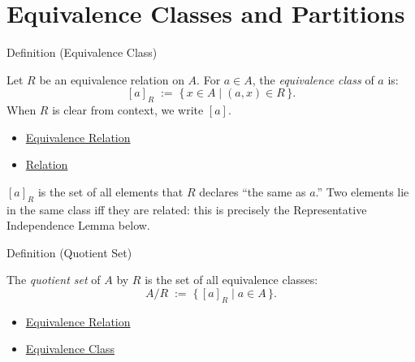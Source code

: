 
\section{Equivalence Classes and Partitions}


\begin{definitionbox}{Definition (Equivalence Class)}
\begin{definition}\label{def:equiv-class}
Let $R$ be an equivalence relation on $A$. For $a \in A$, the
\emph{equivalence class} of $a$ is:
\[
[a]_R \;:=\; \{\, x \in A \mid (a,x) \in R \,\}.
\]
When $R$ is clear from context, we write $[a]$.
\end{definition}
\end{definitionbox}

\begin{dependencies}
\begin{itemize}
  \item \hyperref[def:equivalence-relation]{Equivalence Relation}
  \item \hyperref[def:relation]{Relation}
\end{itemize}
\end{dependencies}

\begin{remark*}
$[a]_R$ is the set of all elements that $R$ declares ``the same as $a$.''
Two elements lie in the same class iff they are related: this is precisely
the Representative Independence Lemma below.
\end{remark*}

\begin{definitionbox}{Definition (Quotient Set)}
\begin{definition}\label{def:quotient-set}
The \emph{quotient set} of $A$ by $R$ is the set of all equivalence classes:
\[
A / R \;:=\; \{\, [a]_R \mid a \in A \,\}.
\]
\end{definition}
\end{definitionbox}

\begin{dependencies}
\begin{itemize}
  \item \hyperref[def:equivalence-relation]{Equivalence Relation}
  \item \hyperref[def:equiv-class]{Equivalence Class}
\end{itemize}
\end{dependencies}

